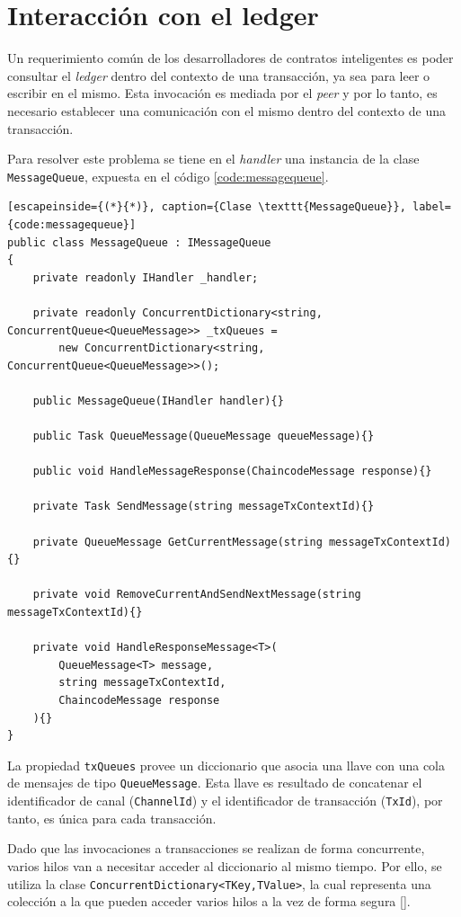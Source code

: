 \section{Interacción con el ledger}\label{ledgerinteraction}
Un requerimiento común de los desarrolladores de contratos inteligentes es poder consultar el \textit{ledger} dentro del contexto de una transacción, ya sea para leer o escribir en el mismo. Esta invocación es mediada por el \textit{peer} y por lo tanto, es necesario establecer una comunicación con el mismo dentro del contexto de una transacción.

Para resolver este problema se tiene en el \textit{handler} una instancia de la clase \texttt{MessageQueue}, expuesta en el código \ref{code:messagequeue}.\\

\begin{lstlisting}[escapeinside={(*}{*)}, caption={Clase \texttt{MessageQueue}}, label={code:messagequeue}]
public class MessageQueue : IMessageQueue
{
    private readonly IHandler _handler;

    private readonly ConcurrentDictionary<string, ConcurrentQueue<QueueMessage>> _txQueues =
        new ConcurrentDictionary<string, ConcurrentQueue<QueueMessage>>();

    public MessageQueue(IHandler handler){}

    public Task QueueMessage(QueueMessage queueMessage){}

    public void HandleMessageResponse(ChaincodeMessage response){}

    private Task SendMessage(string messageTxContextId){}

    private QueueMessage GetCurrentMessage(string messageTxContextId){}

    private void RemoveCurrentAndSendNextMessage(string messageTxContextId){}

    private void HandleResponseMessage<T>(
        QueueMessage<T> message,
        string messageTxContextId,
        ChaincodeMessage response
    ){}
}
\end{lstlisting}
La propiedad \texttt{txQueues} provee un diccionario que asocia una llave con una cola de mensajes de tipo \texttt{QueueMessage}. Esta llave es resultado de concatenar el identificador de canal (\texttt{ChannelId}) y el identificador de transacción (\texttt{TxId}), por tanto, es única para cada transacción.

Dado que las invocaciones a transacciones se realizan de forma concurrente, varios hilos van a necesitar acceder al diccionario al mismo tiempo. Por ello, se utiliza la clase \texttt{ConcurrentDictionary<TKey,TValue>}, la cual representa una colección a la que pueden acceder varios hilos a la vez de forma segura [\cite{microsoftdoc}].

